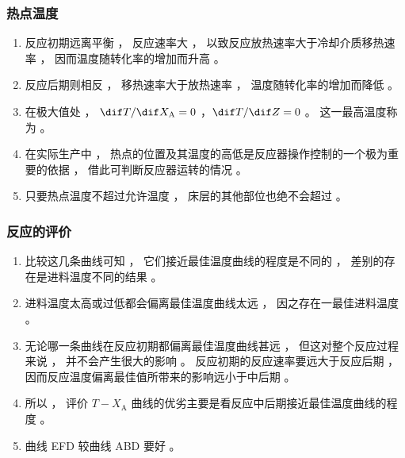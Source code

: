 \begin{frame}
    \frametitle{热点温度}
    \begin{enumerate}
      \item 反应初期远离平衡 ， 反应速率大 ， 以致反应放热速率大于冷却介质移热速率 ， 因而温度随转化率的增加而升高 。
      \item 反应后期则相反 ， 移热速率大于放热速率 ， 温度随转化率的增加而降低 。
      \item 在极大值处 ， $\dif T/\dif X_\mathrm{A}=0$ ，$\dif T/\dif Z=0$  。 这一最高温度称为 。
      \item 在实际生产中 ， 热点的位置及其温度的高低是反应器操作控制的一个极为重要的依据 ， 借此可判断反应器运转的情况 。 
      \item 只要热点温度不超过允许温度 ， 床层的其他部位也绝不会超过 。
    \end{enumerate}
       
\end{frame}


\begin{frame}
    \frametitle{反应的评价}
    \begin{enumerate}
      \item 比较这几条曲线可知 ， 它们接近最佳温度曲线的程度是不同的 ， 差别的存在是进料温度不同的结果 。
      \item 进料温度太高或过低都会偏离最佳温度曲线太远 ， 因之存在一最佳进料温度 。
      \item 无论哪一条曲线在反应初期都偏离最佳温度曲线甚远 ， 但这对整个反应过程来说 ， 并不会产生很大的影响 。 反应初期的反应速率要远大于反应后期 ， 因而反应温度偏离最佳值所带来的影响远小于中后期 。
      \item 所以 ， 评价 $T-X_\mathrm{A}$ 曲线的优劣主要是看反应中后期接近最佳温度曲线的程度 。
      \item 曲线 EFD 较曲线 ABD 要好 。
    \end{enumerate}
\end{frame}


